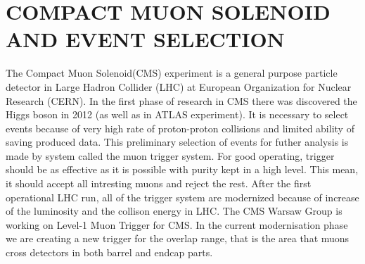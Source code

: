 \section{COMPACT MUON SOLENOID AND EVENT SELECTION}
\label{sec:1_CMS}

The Compact Muon Solenoid(CMS) experiment is a general purpose particle detector in Large Hadron Collider (LHC) at European Organization for Nuclear Research (CERN).
In the first phase of research in CMS there was discovered the Higgs boson in 2012 (as well as in ATLAS experiment).
It is necessary to select events because of very high rate of proton-proton collisions and limited ability of saving produced data.
This preliminary selection of events for futher analysis is made by system called the muon trigger system.
For good operating, trigger should be as effective as it is possible with purity kept in a high level.
This mean, it should accept all intresting muons and reject the rest.
After the first operational LHC run, all of the trigger system are modernized because of increase of the luminosity and the collison energy in LHC.
The CMS Warsaw Group is working on Level-1 Muon Trigger for CMS.
In the current modernisation phase we are creating a new trigger for the overlap range, that is the area that muons cross detectors in both barrel and endcap parts.

